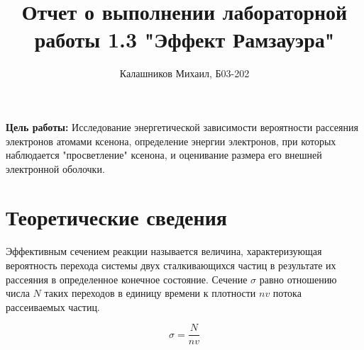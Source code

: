 \documentclass[14pt, a4paper]{report}
\title{\textbf{Отчет о выполнении лабораторной работы 1.3 "Эффект Рамзауэра"}}
\author{Калашников Михаил, Б03-202}
\date{}
\begin{document}
\maketitle

\textbf{Цель работы:}
Исследование энергетической зависимости вероятности рассеяния электронов атомами ксенона, определение энергии электронов, при которых наблюдается "просветление" ксенона, и оценивание размера его внешней электронной оболочки.
\newline

\section{Теоретические сведения}

Эффективным сечением реакции называется величина, характеризующая вероятность перехода системы двух сталкивающихся частиц в результате их рассеяния в определенное конечное состояние. Сечение $\sigma$ равно отношению числа $N$ таких переходов в единицу времени к плотности $nv$ потока рассеиваемых частиц.

\[\sigma=\frac{N}{nv}\]
\end{document}
